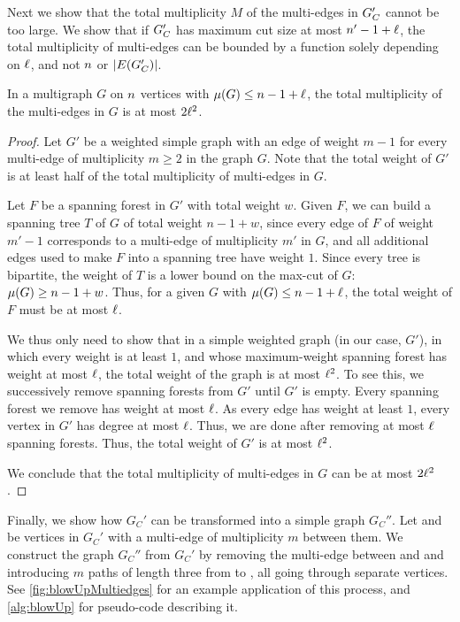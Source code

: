 \documentclass[a4paper,UKenglish,cleveref, thm-restate]{lipics-v2021}
\begin{document}
Next we show that the total multiplicity $M$ of the multi-edges in $G_\Colors'$ cannot be too large. We show that if $G_\Colors'$ has maximum cut size at most $\dimension'-1+\constB$, the total multiplicity of multi-edges can be bounded by a function solely depending on $\constB$, and not $\dimension$ or $|E(G_\Colors')|$.

\begin{lemma}
\label{lem:d+l-separable=>AtMostk2Multiedges}
In a multigraph $G$ on $\dimension$ vertices with $\mu(G)\leq \dimension-1+\constB$, the total multiplicity of the multi-edges in $G$ is at most $2\constB^2$.
\end{lemma}
\begin{proof}
Let  $G'$ be a weighted simple graph with an edge of weight $m-1$ for every multi-edge of multiplicity $m\geq 2$ in the graph $G$.
Note that the total weight of $G'$ is at least half of the total multiplicity of multi-edges in $G$. 

Let $F$ be a spanning forest in $G'$ with total weight $w$. 
Given $F$, we can build a spanning tree $T$ of $G$ of total weight $n-1+w$, since every edge of $F$ of weight $m'-1$ corresponds to a multi-edge of multiplicity $m'$ in $G$, and all additional edges used to make $F$ into a spanning tree have weight $1$. Since every tree is bipartite, the weight of $T$ is a lower bound on the max-cut of $G$: $\mu(G) \geq \dimension-1+w$.
Thus, for a given $G$ with $\mu(G) \leq \dimension-1+\constB$, the total weight of $F$ must be at most $\constB$.

We thus only need to show that in a simple weighted graph (in our case, $G'$), in which every weight is at least $1$, and whose maximum-weight spanning forest has weight at most $\constB$, the total weight of the graph is at most $\constB^2$. To see this, we successively remove spanning forests from $G'$ until $G'$ is empty. Every spanning forest we remove has weight at most $\constB$. As every edge has weight at least $1$, every vertex in $G'$ has degree at most $\constB$. Thus, we are done after removing at most $\constB$ spanning forests. Thus, the total weight of $G'$ is at most $\constB^2$.

We conclude that the total multiplicity of multi-edges in $G$ can be at most $2\constB^2$.
\end{proof}

Finally, we show how $G_C'$ can be transformed into a simple graph $G_C''$. Let \nodeA and \nodeB be vertices in $G_C'$ with a multi-edge of multiplicity $m$ between them.
We construct the graph $G_C''$ from $G_C'$ by removing the multi-edge between \nodeA and \nodeB and introducing $m$ paths of length three from \nodeA to \nodeB, all going through separate vertices.
See \cref{fig:blowUpMultiedges} for an example application of this process, and \cref{alg:blowUp} for pseudo-code describing it.
\end{document}
